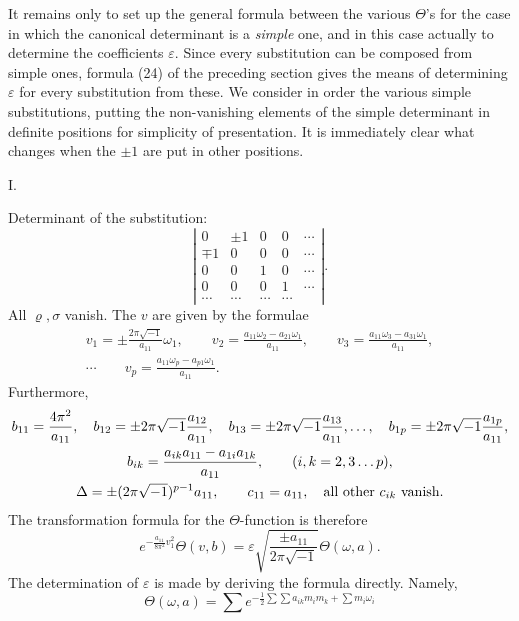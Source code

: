 \documentclass[10pt]{article}
\begin{document}
It remains only to set up the general formula between the various \(\Theta\)'s for the case in which the canonical determinant is a \emph{simple} one, and in this case actually to determine the coefficients \(\varepsilon\). Since every substitution can be composed from simple ones, formula (24) of the preceding section gives the means of determining \(\varepsilon\) for every substitution from these. We consider in order the various simple substitutions, putting the non-vanishing elements of the simple determinant in definite positions for simplicity of presentation. It is immediately clear what changes when the \(\pm1\) are put in other positions.

\begin{center}I.\end{center}

Determinant of the substitution:
\[
\left|\begin{array}{ccccc}
0&\pm1&0&0&\cdots\\
\mp1&0&0&0&\cdots\\
0&0&1&0&\cdots\\
0&0&0&1&\cdots\\
\cdots&\cdots&\cdots&\cdots&
\end{array}\right|.
\]
All \(\varrho,\sigma\) vanish. The \(v\) are given by the formulae
\[
\begin{gathered}
v_1=\pm\frac{2\pi\sqrt{-1}}{a_{11}}\omega_1,\qquad
v_2=\frac{a_{11}\omega_2-a_{21}\omega_1}{a_{11}},\qquad
v_3=\frac{a_{11}\omega_3-a_{31}\omega_1}{a_{11}},\\
\cdots\qquad
v_p=\frac{a_{11}\omega_p-a_{p1}\omega_1}{a_{11}}.
\end{gathered}
\]
Furthermore,
\[
\begin{gathered}
b_{11}=\frac{4\pi^2}{a_{11}},
\quad b_{12}=\pm2\pi\sqrt{-1}\frac{a_{12}}{a_{11}},
\quad b_{13}=\pm2\pi\sqrt{-1}\frac{a_{13}}{a_{11}},\ldots,
\quad b_{1p}=\pm2\pi\sqrt{-1}\frac{a_{1p}}{a_{11}},\\
b_{ik}=\frac{a_{ik}a_{11}-a_{1i}a_{1k}}{a_{11}},\qquad (i,k=2,3\ldots p),\\
\Delta=\pm(2\pi\sqrt{-1})^{p-1}a_{11},
\qquad c_{11}=a_{11},\quad\hbox{all other }c_{ik}\hbox{ vanish.}
\end{gathered}
\]
The transformation formula for the \(\Theta\)-function is therefore
\[
e^{-\frac{a_{11}}{8\pi^2}v_1^2}\Theta(v,b)
=\varepsilon\sqrt{\frac{\pm a_{11}}{2\pi\sqrt{-1}}}\Theta(\omega,a).
\]
The determination of \(\varepsilon\) is made by deriving the formula directly. Namely,
\[
\Theta(\omega,a)=\sum e^{-\frac12\sum\sum a_{ik}m_im_k+\sum m_i\omega_i}
\]
\end{document}
